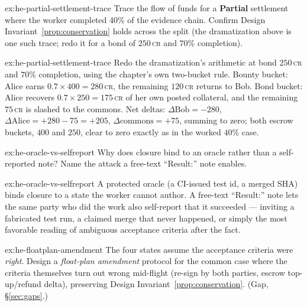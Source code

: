 \documentclass[11pt,a4paper]{article}
\theoremstyle{definition}
\theoremstyle{definition}
\theoremstyle{remark}
\begin{document}

\begin{pdexercise}[kind=Trace,rating=2]{ex:he-partial-settlement-trace}
Trace the flow of funds for a \textbf{Partial} settlement where the worker
  completed 40\% of the evidence chain. Confirm Design Invariant~\ref{prop:conservation}
  holds across the split (the dramatization above is one such trace; redo it for a
  bond of $250$\,\textsc{cr} and $70\%$ completion).
\end{pdexercise}
\begin{pdsolution}{ex:he-partial-settlement-trace}
Redo the dramatization's arithmetic at bond $250$\,\textsc{cr} and $70\%$
completion, using the chapter's own two-bucket rule. Bounty bucket: Alice earns
$0.7\times400=280$\,\textsc{cr}, the remaining $120$\,\textsc{cr} returns to Bob.
Bond bucket: Alice recovers $0.7\times250=175$\,\textsc{cr} of her own posted
collateral, and the remaining $75$\,\textsc{cr} is slashed to the commons. Net
deltas: $\Delta\text{Bob}=-280$, $\Delta\text{Alice}=+280-75=+205$,
$\Delta\text{commons}=+75$, summing to zero; both escrow buckets, $400$ and
$250$, clear to zero exactly as in the worked $40\%$ case.
\end{pdsolution}
\begin{pdexercise}[kind=Check,rating=1]{ex:he-oracle-vs-selfreport}
Why does closure bind to an oracle rather than a self-reported note? Name the
  attack a free-text ``Result:'' note enables.
\end{pdexercise}
\begin{pdsolution}{ex:he-oracle-vs-selfreport}
A protected oracle (a CI-issued test id, a merged SHA) binds closure to a
state the worker cannot author. A free-text ``Result:'' note lets the same party
who did the work also self-report that it succeeded --- inviting a fabricated
test run, a claimed merge that never happened, or simply the most favorable
reading of ambiguous acceptance criteria after the fact.
\end{pdsolution}
\begin{pdexercise}[kind=Open,rating=3]{ex:he-floatplan-amendment}
The four states assume the acceptance criteria were \emph{right}.
  Design a \emph{float-plan amendment} protocol for the common case where the
  criteria themselves turn out wrong mid-flight (re-sign by both parties, escrow
  top-up/refund delta), preserving Design Invariant~\ref{prop:conservation}. (Gap, \S\ref{sec:gaps}.)
\end{pdexercise}
\end{document}
